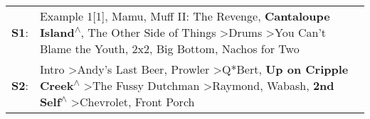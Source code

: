 \begin{supertabular}{p{0.03\textwidth}p{0.92\textwidth}}
 \textbf{S1}:  &                                                              Example 1[1]\textsuperscript{}, \enspace Mamu\textsuperscript{}, \enspace Muff II: The Revenge\textsuperscript{}, \enspace \textbf{Cantaloupe Island\textsuperscript{$\wedge$}}, \enspace The Other Side of Things\textsuperscript{} \textgreater \enspace Drums\textsuperscript{} \textgreater \enspace You Can't Blame the Youth\textsuperscript{}, \enspace 2x2\textsuperscript{}, \enspace Big Bottom\textsuperscript{}, \enspace Nachos for Two\textsuperscript{}  \enspace  \\
 \textbf{S2}:  &  Intro\textsuperscript{} \textgreater \enspace Andy's Last Beer\textsuperscript{}, \enspace Prowler\textsuperscript{} \textgreater \enspace Q*Bert\textsuperscript{}, \enspace \textbf{Up on Cripple Creek\textsuperscript{$\wedge$}} \textgreater \enspace The Fussy Dutchman\textsuperscript{} \textgreater \enspace Raymond\textsuperscript{}, \enspace Wabash\textsuperscript{}, \enspace \textbf{2nd Self\textsuperscript{$\wedge$}} \textgreater \enspace Chevrolet\textsuperscript{}, \enspace Front Porch\textsuperscript{}  \enspace  \\
\end{supertabular}
